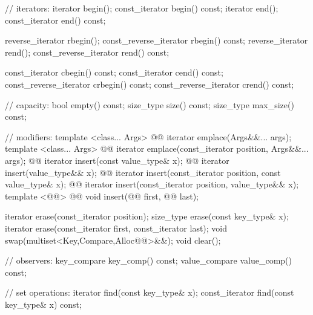 \documentclass[american,twoside]{book}
\begin{document}
\begin{codeblock}
{{    // iterators:
    iterator               begin();
    const_iterator         begin() const;
    iterator               end();
    const_iterator         end() const;

    reverse_iterator       rbegin();
    const_reverse_iterator rbegin() const;
    reverse_iterator       rend();
    const_reverse_iterator rend() const;

    const_iterator         cbegin() const;
    const_iterator         cend() const;
    const_reverse_iterator crbegin() const;
    const_reverse_iterator crend() const;

    // capacity:
    bool          empty() const;
    size_type     size() const;
    size_type     max_size() const;

    // modifiers:
    template <class... Args> 
      @@
      iterator emplace(Args&&... args);
    template <class... Args> 
      @@
      iterator emplace(const_iterator position, Args&&... args);
    @@ 
      iterator insert(const value_type& x);
    @@ 
      iterator insert(value_type&& x);
    @@ 
      iterator insert(const_iterator position, const value_type& x);
    @@ 
      iterator insert(const_iterator position, value_type&& x);
    template <@@>
      @@
      void insert(@@ first, @@ last);

    iterator  erase(const_iterator position);
    size_type erase(const key_type& x);
    iterator  erase(const_iterator first, const_iterator last);
    void swap(multiset<Key,Compare,Alloc@@>&&);
    void clear();

    // observers:
    key_compare   key_comp() const;
    value_compare value_comp() const;

    // set operations:
    iterator        find(const key_type& x);
    const_iterator  find(const key_type& x) const;

}}
\end{codeblock}
\end{document}
